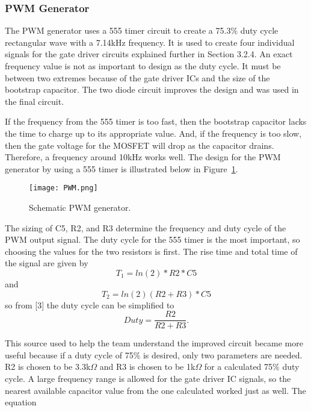 \documentclass[11pt,letter]{article}
\begin{document}
\subsubsection{PWM Generator}

The PWM generator uses a 555 timer circuit to create a  75.3$\%$ duty cycle rectangular wave with a 7.14kHz frequency. It is used to create four individual signals for the gate driver circuits explained further in Section 3.2.4. An exact frequency value is not as important to design as the duty cycle. It must be between two extremes because of the gate driver ICs and the size of the bootstrap capacitor. The two diode circuit improves the design and was used in the final circuit.

If the frequency from the 555 timer is too fast, then the bootstrap capacitor lacks the time to charge up to its appropriate value. And, if the frequency is too slow, then the gate voltage for the MOSFET will drop as the capacitor drains. Therefore, a frequency around 10kHz works well. The design for the PWM generator by using a 555 timer is illustrated below in Figure~\ref{fig:PWM}.

\begin{figure}[H]
    \centering
    \texttt{[image: PWM.png]}
    \caption{Schematic PWM generator.}
    \label{fig:PWM}
\end{figure}

The sizing of C5, R2, and R3 determine the frequency and duty cycle of the PWM output signal. The duty cycle for the 555 timer is the most important, so choosing the values for the two resistors is first. The rise time and total time of the signal are given by
\begin{equation}
    T_1 = ln(2)*R2*C5
\end{equation}
and
\begin{equation}
     T_2 = ln(2)(R2+R3)*C5
\end{equation}
so from [3] the duty cycle can be simplified to
\begin{equation}
    Duty = \frac{R2}{R2+R3}.
\end{equation}

This source used to help the team understand the improved circuit became more useful because if a duty cycle of 75$\%$ is desired, only two parameters are needed. R2 is chosen to be 3.3k$\Omega$ and R3 is chosen to be 1k$\Omega$ for a calculated 75$\%$ duty cycle. A large frequency range is allowed for the gate driver IC signals, so the nearest available capacitor value from the one calculated worked just as well. The equation
\end{document}
